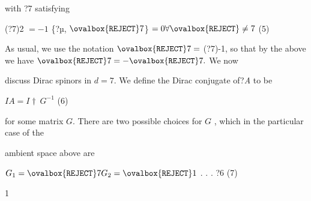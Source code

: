 \documentclass[a4paper,12pt]{article}
\begin{document}
with ?7 satisfying
\begin{center}
(?7)2 $=-1$ \{?µ, $\ovalbox{\tt\small REJECT} 7$\} $=0 \forall\ovalbox{\tt\small REJECT}\neq 7$   (5)
\end{center}
As usual, we use the notation $\ovalbox{\tt\small REJECT} 7=$ (?7)-1, so that by the above we have $\ovalbox{\tt\small REJECT} 7=-\ovalbox{\tt\small REJECT} 7.$ We now

discuss Dirac spinors in $d=7$. We define the Dirac conjugate of?{\it A} to be
\begin{center}
$I A=I\dagger\ G^{-1}$   (6)
\end{center}
for some matrix $G$. There are two possible choices for $G$ , which in the particular case of the

ambient space above are
\begin{center}
$G_{1}=\ovalbox{\tt\small REJECT} 7 G_{2}=\ovalbox{\tt\small REJECT} 1$ . . . ?6   (7)
\end{center}
1
\end{document}
